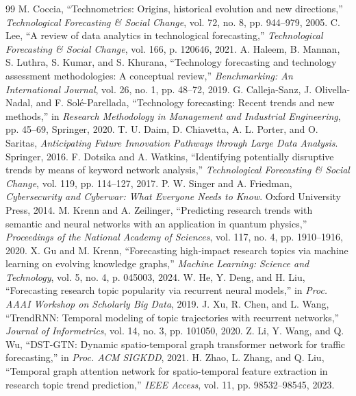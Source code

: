 \documentclass[pdflatex,sn-basic]{sn-jnl}
\begin{document}
\begin{thebibliography}{99}
   M. Coccia, ``Technometrics: Origins, historical evolution and new directions,'' \textit{Technological Forecasting \& Social Change}, vol. 72, no. 8, pp. 944--979, 2005.
   C. Lee, ``A review of data analytics in technological forecasting,'' \textit{Technological Forecasting \& Social Change}, vol. 166, p. 120646, 2021.
   A. Haleem, B. Mannan, S. Luthra, S. Kumar, and S. Khurana, ``Technology forecasting and technology assessment methodologies: A conceptual review,'' \textit{Benchmarking: An International Journal}, vol. 26, no. 1, pp. 48--72, 2019.
   G. Calleja-Sanz, J. Olivella-Nadal, and F. Solé-Parellada, ``Technology forecasting: Recent trends and new methods,'' in \textit{Research Methodology in Management and Industrial Engineering}, pp. 45--69, Springer, 2020.
   T. U. Daim, D. Chiavetta, A. L. Porter, and O. Saritas, \textit{Anticipating Future Innovation Pathways through Large Data Analysis}. Springer, 2016.
   F. Dotsika and A. Watkins, ``Identifying potentially disruptive trends by means of keyword network analysis,'' \textit{Technological Forecasting \& Social Change}, vol. 119, pp. 114--127, 2017.
   P. W. Singer and A. Friedman, \textit{Cybersecurity and Cyberwar: What Everyone Needs to Know}. Oxford University Press, 2014.
   M. Krenn and A. Zeilinger, ``Predicting research trends with semantic and neural networks with an application in quantum physics,'' \textit{Proceedings of the National Academy of Sciences}, vol. 117, no. 4, pp. 1910--1916, 2020.
   X. Gu and M. Krenn, ``Forecasting high-impact research topics via machine learning on evolving knowledge graphs,'' \textit{Machine Learning: Science and Technology}, vol. 5, no. 4, p. 045003, 2024.
   W. He, Y. Deng, and H. Liu, ``Forecasting research topic popularity via recurrent neural models,'' in \textit{Proc. AAAI Workshop on Scholarly Big Data}, 2019.
   J. Xu, R. Chen, and L. Wang, ``TrendRNN: Temporal modeling of topic trajectories with recurrent networks,'' \textit{Journal of Informetrics}, vol. 14, no. 3, pp. 101050, 2020.
   Z. Li, Y. Wang, and Q. Wu, ``DST-GTN: Dynamic spatio-temporal graph transformer network for traffic forecasting,'' in \textit{Proc. ACM SIGKDD}, 2021.
   H. Zhao, L. Zhang, and Q. Liu, ``Temporal graph attention network for spatio-temporal feature extraction in research topic trend prediction,'' \textit{IEEE Access}, vol. 11, pp. 98532--98545, 2023.
  \end{thebibliography}
\end{document}
